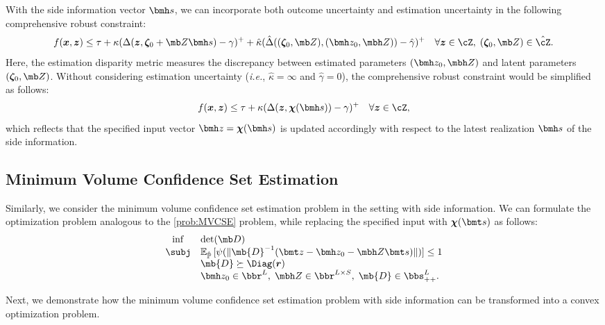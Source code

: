 \documentclass[mnsc, nonblindrev]{informswp}
\newcommand{\1}[1]{\mathds{1}{\left(#1\right)}}
\begin{document}
With the side information vector $\bmh s$, we can incorporate  both outcome uncertainty and estimation uncertainty in the following comprehensive robust constraint:
\[
f(\bm x,\bm z) \leq \tau + \kappa (\Delta({\bm z},\bm \zeta_0 + \mb Z \bmh s ) - \gamma)^+ + \hat \kappa (\hat \Delta((\bm \zeta_0, \mb Z),(\bmh z_0,\mbh Z)) - \hat \gamma)^+  ~~~\forall \bm z \in \cZ, \; (\bm \zeta_0,\mb Z) \in \hat \cZ.
\]
Here, the estimation disparity metric measures the discrepancy between estimated parameters $(\bmh z_0,\mbh Z)$ and latent parameters $(\bm \zeta_0,\mb Z)$.
Without considering estimation uncertainty (\textit{i.e.}, $\hat \kappa = \infty$ and $\hat \gamma =0$), the comprehensive robust constraint would be simplified as follows: 
\[
f(\bm x,\bm z) \leq \tau + \kappa (\Delta(\bm z, \bm \chi(\bmh s) ) - \gamma)^+  ~~~\forall \bm z \in \cZ,
\]
which reflects that the specified input vector $\bmh z= \bm \chi(\bmh s)$ is updated accordingly with respect to the latest realization $\bmh s$ of the side information. 

\subsection*{Minimum Volume Confidence Set Estimation}
Similarly, we consider the minimum volume confidence set estimation problem in the setting with side information. We can formulate the optimization problem analogous to the \ref{prob:MVCSE} problem, while replacing the specified input with $\bm \chi(\bmt s)$ as follows:
\begin{equation}
\label{prob:MVCSE_Side_Info}
\begin{array}{cll}
\inf & \det(\mb D) \\
\subj & \mathbb{E}_{\hat{\mathbb{P}}}\,[\psi(\|\mb{D}^{-1}( \bmt z - \bmh z_0 - \mbh Z \bmt s )\|)] \leq 1 \\
& \mb{D} \succeq \Diag(\bm r) \\
& \bmh z_0 \in \bbr^L, \; \mbh Z \in \bbr^{L \times S}, \; \mb{D} \in \bbs^{L}_{++}.
\end{array} 
\end{equation}

Next, we demonstrate how the minimum volume confidence set estimation problem with side information can be transformed into a convex optimization problem.
\end{document}
